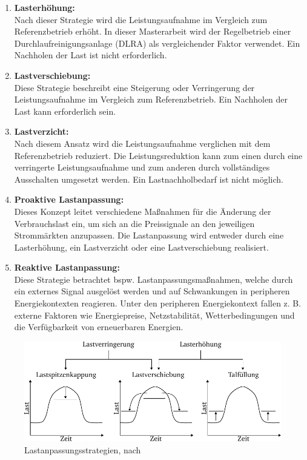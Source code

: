 \begin{enumerate}[label=\textbf{\arabic*}.]
	\item \textbf{Lasterhöhung:} \\Nach dieser Strategie wird die Leistungsaufnahme im Vergleich zum Referenzbetrieb erhöht. In dieser Masterarbeit wird der Regelbetrieb einer Durchlaufreinigungsanlage (DLRA) als vergleichender Faktor verwendet. Ein Nachholen der Last ist nicht erforderlich.
	
	\item \textbf{Lastverschiebung:} \\Diese Strategie beschreibt eine Steigerung oder Verringerung der Leistungsaufnahme im Vergleich zum Referenzbetrieb. Ein Nachholen der Last kann erforderlich sein. 
	
	\item \textbf{Lastverzicht:} \\Nach diesem Ansatz wird die Leistungsaufnahme verglichen mit dem Referenzbetrieb reduziert. Die Leistungsreduktion kann zum einen durch eine verringerte Leistungsaufnahme und zum anderen durch vollständiges Ausschalten umgesetzt werden. Ein Lastnachholbedarf ist nicht möglich. 
	
	\item \textbf{Proaktive Lastanpassung:} \\Dieses Konzept leitet verschiedene Maßnahmen für die Änderung der Verbrauchslast ein, um sich an die Preissignale an den jeweiligen Strommärkten anzupassen. Die Lastanpassung wird entweder durch eine Lasterhöhung, ein Lastverzicht oder eine Lastverschiebung realisiert.
	
	\item \textbf{Reaktive Lastanpassung:} \\Diese Strategie betrachtet bspw. Lastanpassungsmaßnahmen, welche durch ein externes Signal ausgelöst werden und auf Schwankungen in peripheren Energiekontexten reagieren. Unter den peripheren Energiekontext fallen z. B. externe Faktoren wie Energiepreise, Netzstabilität, Wetterbedingungen und die Verfügbarkeit von erneuerbaren Energien.
\end{enumerate}

\begin{figure}[h]
	\centering
	\includegraphics[width=400pt]{figures/03_Grundlagen/Lastanpassungsstrategien.pdf}
	\caption{Lastanpassungsstrategien, nach \cite{waltherMethodologyClassificationCharacterisation2022}}
	\label{fig_03Lastanpassungsstrategien}
\end{figure}

